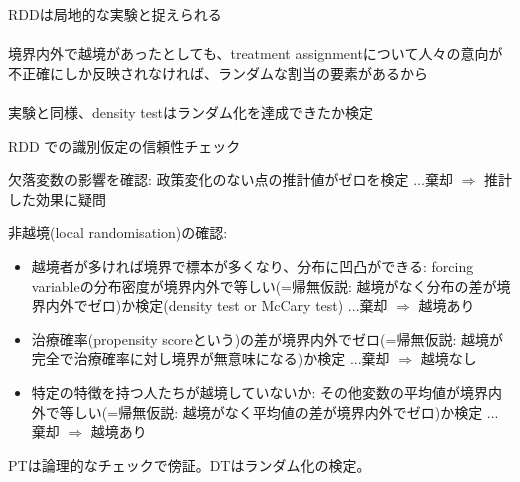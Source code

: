 \begin{frame}{}
RDDは局地的な実験と捉えられる\\~\\
境界内外で越境があったとしても、treatment assignmentについて人々の意向が不正確にしか反映されなければ、ランダムな割当の要素があるから\\~\\
実験と同様、density testはランダム化を達成できたか検定
\end{frame}


\begin{frame}{}
RDD	での識別仮定の信頼性チェック
\begin{description}
\vspace{1.0ex}\setlength{\itemsep}{1.0ex}\setlength{\baselineskip}{12pt}
\pause
\item[placebo test]	欠落変数の影響を確認: 政策変化のない点の推計値がゼロを検定\pause
...棄却 $\Rightarrow$ 推計した効果に疑問
\pause
\item[density test]	非越境(local randomisation)の確認: 
	\begin{itemize}
	\vspace{1.0ex}\setlength{\itemsep}{1.0ex}\setlength{\baselineskip}{12pt}
\pause
	\item	越境者が多ければ境界で標本が多くなり、分布に凹凸ができる: forcing variableの分布密度が境界内外で等しい(=帰無仮説: 越境がなく分布の差が境界内外でゼロ)か検定(density test or McCary test)\pause
...棄却 $\Rightarrow$ 越境あり 
\pause
	\item	治療確率(propensity scoreという)の差が境界内外でゼロ(=帰無仮説: 越境が完全で治療確率に対し境界が無意味になる)か検定\pause
...棄却 $\Rightarrow$ 越境なし
\pause
	\item	特定の特徴を持つ人たちが越境していないか: その他変数の平均値が境界内外で等しい(=帰無仮説: 越境がなく平均値の差が境界内外でゼロ)か検定\pause
...棄却 $\Rightarrow$ 越境あり
	\end{itemize}
\end{description}
\vspace*{2ex}
\pause
PTは論理的なチェックで傍証。DTはランダム化の検定。
\end{frame}


